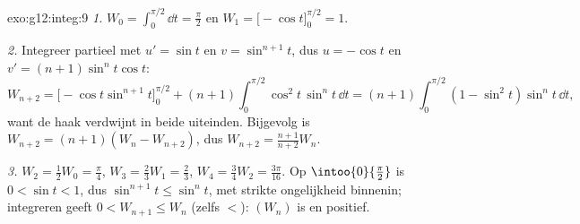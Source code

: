 \begin{solution}{exo:g12:integ:9}
\emph{1.} $W_0 = \int_0^{\pi/2} \dd t = \frac{\pi}{2}$ en
$W_1 = \bigl[-\cos t\bigr]_0^{\pi/2} = 1$.

\emph{2.} Integreer partieel met $u' = \sin t$ en $v = \sin^{n+1} t$, dus
$u = -\cos t$ en $v' = (n+1)\sin^n t \cos t$:
\[
W_{n+2} = \bigl[-\cos t \sin^{n+1} t\bigr]_0^{\pi/2}
+ (n+1)\int_0^{\pi/2} \cos^2 t\,\sin^n t\,\dd t
= (n+1)\int_0^{\pi/2} (1 - \sin^2 t)\sin^n t\,\dd t,
\]
want de haak verdwijnt in beide uiteinden. Bijgevolg is
$W_{n+2} = (n+1)(W_n - W_{n+2})$, dus
$W_{n+2} = \frac{n+1}{n+2} W_n$.

\emph{3.} $W_2 = \frac12 W_0 = \frac{\pi}{4}$,
$W_3 = \frac23 W_1 = \frac23$, $W_4 = \frac34 W_2 = \frac{3\pi}{16}$. Op
$\intoo{0}{\frac\pi2}$ is $0 < \sin t < 1$, dus
$\sin^{n+1} t \leq \sin^n t$, met strikte ongelijkheid binnenin; integreren
geeft $0 < W_{n+1} \leq W_n$ (zelfs $<$): $(W_n)$ is  en positief.
\end{solution}

